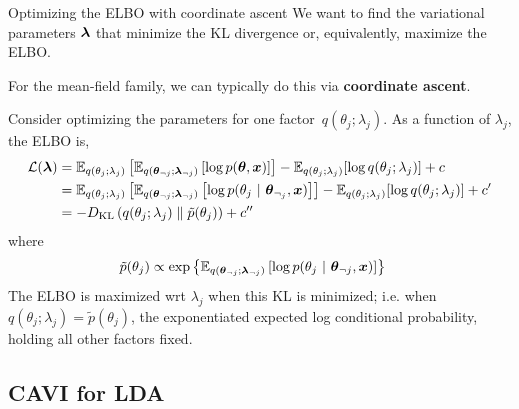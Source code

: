 \documentclass[aspectratio=169]{beamer}
\begin{document}
\begin{frame}{Optimizing the ELBO with coordinate ascent}
We want to find the variational parameters $\boldsymbol{\lambda}$ that minimize the KL divergence or, equivalently, maximize the ELBO.

For the mean-field family, we can typically do this via \textbf{coordinate ascent}. 

Consider optimizing the parameters for one factor~$q(\theta_j; \lambda_j)$. As a function of $\lambda_j$, the ELBO is,
\begin{align}
    \mathcal{L}(\boldsymbol{\lambda}) 
    &= 
    \mathbb{E}_{q(\theta_j; \lambda_j)}\left[ \mathbb{E}_{q(\boldsymbol{\theta}_{\neg j}; \boldsymbol{\lambda}_{\neg j})} \left[ \log p(\boldsymbol{\theta}, \boldsymbol{x}) \right] \right] -
    \mathbb{E}_{q(\theta_j; \lambda_j)}[\log q(\theta_j; \lambda_j)] + c \\
    &= 
    \mathbb{E}_{q(\theta_j; \lambda_j)}\left[ \mathbb{E}_{q(\boldsymbol{\theta}_{\neg j}; \boldsymbol{\lambda}_{\neg j})} \left[ \log p(\theta_j ~\vert~ \boldsymbol{\theta}_{\neg_j}, \boldsymbol{x}) \right] \right] -
    \mathbb{E}_{q(\theta_j; \lambda_j)}[\log q(\theta_j; \lambda_j)] + c' \\
    &= -D_{\textrm{KL}}\left(q(\theta_j; \lambda_j)\;\|\;\tilde{p}(\theta_j)\right) + c''
\end{align}
where 
\begin{align}
    \label{eq:cavi_form}
    \tilde{p}(\theta_j) &\propto
    \exp \left\{ \mathbb{E}_{q(\boldsymbol{\theta}_{\neg j}; \boldsymbol{\lambda}_{\neg j})} \left[ \log p(\theta_j ~\vert~ \boldsymbol{\theta}_{\neg j}, \boldsymbol{x}) \right] \right\}
\end{align}
The ELBO is maximized wrt $\lambda_j$ when this KL is minimized; i.e. when $q(\theta_j ; \lambda_j) = \tilde{p}(\theta_j)$, the exponentiated expected log conditional probability, holding all other factors fixed.
\end{frame}


\subsection{CAVI for LDA}
\label{sec:cavi_lda}
\end{document}
